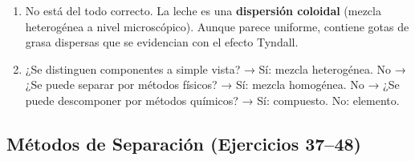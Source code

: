 \documentclass[12pt, letterpaper]{article}
\begin{document}
\begin{enumerate}[leftmargin=*, label=\textbf{\arabic*.}]
    \item No está del todo correcto. La leche es una \textbf{dispersión coloidal} (mezcla heterogénea a nivel microscópico). Aunque parece uniforme, contiene gotas de grasa dispersas que se evidencian con el efecto Tyndall.

    \item ¿Se distinguen componentes a simple vista? → Sí: mezcla heterogénea. No → ¿Se puede separar por métodos físicos? → Sí: mezcla homogénea. No → ¿Se puede descomponer por métodos químicos? → Sí: compuesto. No: elemento.
  \end{enumerate}

  \subsection*{Métodos de Separación (Ejercicios 37--48)}
\end{document}
